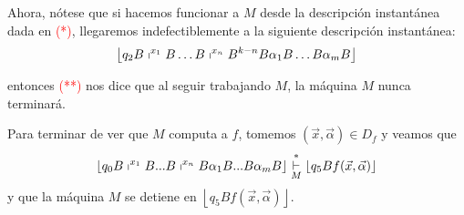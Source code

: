 \begin{frame}
  \begin{block}{}
    \PN Ahora, nótese que si hacemos funcionar a $M$ desde la descripción instantánea dada en \textcolor{red}{(*)},
    llegaremos indefectiblemente a la siguiente descripción instantánea:
    \begin{equation*}
      \left\lfloor q_{2} B \shortmid^{x_{1}} B \dotsc B \shortmid^{x_{n}} B^{k-n}B \alpha_{1} B \dotsc B \alpha_{m} B
      \right\rfloor
    \end{equation*}

    \PN entonces \textcolor{red}{(**)} nos dice que al seguir trabajando $M$, la máquina $M$ nunca terminará.
  \end{block}

  \begin{block}{}
    \PN Para terminar de ver que $M$ computa a $f$, tomemos $(\vec{x},\vec{\alpha}) \in D_{f}$ y veamos que
    \begin{equation*}
      \left\lfloor q_{0}B\shortmid ^{x_{1}}B...B\shortmid ^{x_{n}}B\alpha
      _{1}B...B\alpha _{m}B\right\rfloor \overset{\ast }{\underset{M}{\vdash }}%
      \left\lfloor q_{5}Bf(\vec{x},\vec{\alpha})\right\rfloor
    \end{equation*}
    \PN y que la máquina $M$ se detiene en $\left\lfloor q_{5} B f(\vec{x},\vec{\alpha})\right\rfloor$.
  \end{block}
\end{frame}
